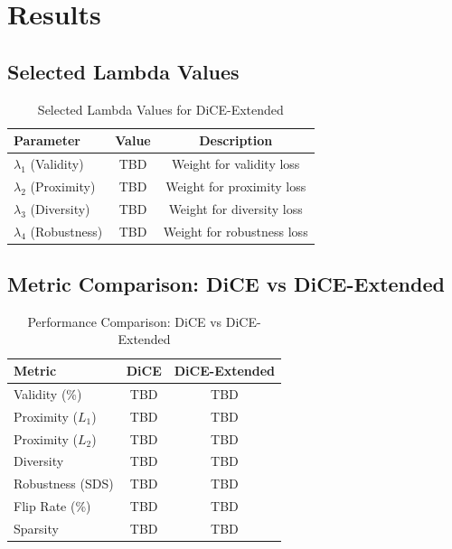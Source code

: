 \documentclass{article}
\begin{document}

\section{Results}
\label{sec:results}

\subsection{Selected Lambda Values}
\label{subsec:selected-lambdas}


\begin{table}[h]
\centering
\caption{Selected Lambda Values for DiCE-Extended}
\label{tab:selected-lambdas}
\begin{tabular}{@{}lcc@{}}
\toprule
Parameter & Value & Description \\ \midrule
$\lambda_1$ (Validity) & TBD & Weight for validity loss \\
$\lambda_2$ (Proximity) & TBD & Weight for proximity loss \\
$\lambda_3$ (Diversity) & TBD & Weight for diversity loss \\
$\lambda_4$ (Robustness) & TBD & Weight for robustness loss \\ \bottomrule
\end{tabular}
\end{table}

\subsection{Metric Comparison: DiCE vs DiCE-Extended}
\label{subsec:metric-comparison}


\begin{table}[h]
\centering
\caption{Performance Comparison: DiCE vs DiCE-Extended}
\label{tab:performance-comparison}
\begin{tabular}{@{}lcc@{}}
\toprule
Metric & DiCE & DiCE-Extended \\ \midrule
Validity (\%) & TBD & TBD \\
Proximity ($L_1$) & TBD & TBD \\
Proximity ($L_2$) & TBD & TBD \\
Diversity & TBD & TBD \\
Robustness (SDS) & TBD & TBD \\
Flip Rate (\%) & TBD & TBD \\
Sparsity & TBD & TBD \\ \bottomrule
\end{tabular}
\end{table}
\end{document}
